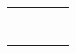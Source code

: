\documentclass[12pt]{article}
\begin{document}
\begin{table}[htb]
{\begin{tabular}{|l|l|l|l|l|}
                        &                        &                         &                         &                        \\ \hline
                        &                        &                         &                         &                        \\ \hline
                        &                        &                         &                         &                        \\ \hline
                        &                        &                         &                         &                        \\ \hline
                        &                        &                         &                         &                        \\ \hline
                        &                        &                         &                         &                        \\ \hline
                        &                        &                         &                         &                        \\ \hline
                        &                        &                         &                         &                        \\ \hline
                        &                        &                         &                         &                        \\ \hline
                    \end{tabular}
}
\end{table}
\end{document}
